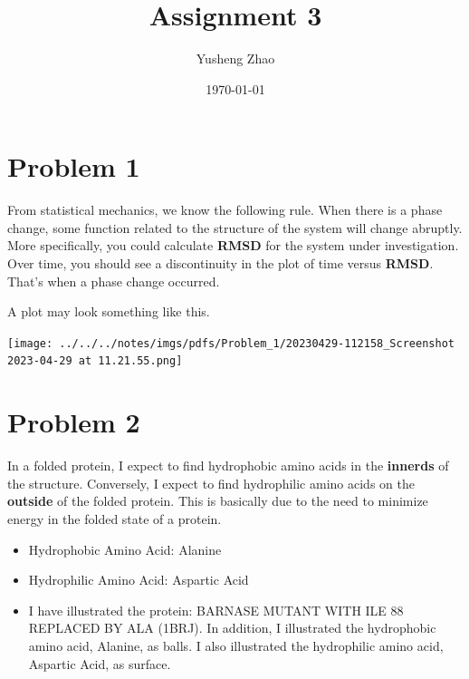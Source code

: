 \documentclass[11pt]{article}
\author{Yusheng Zhao}
\date{\today}
\title{Assignment 3}
\begin{document}
\maketitle


\section{Problem 1}
\label{sec:org65b8fcd}
From statistical mechanics, we know the following rule. When there is a phase
change, some function related to the structure of the system will change
abruptly. More specifically, you could calculate \textbf{RMSD} for the system under
investigation. Over time, you should see a discontinuity in the plot of time
versus \textbf{RMSD}. That's when a phase change occurred.

A plot may look something like this.

\begin{center}
\texttt{[image: ../../../notes/imgs/pdfs/Problem\_1/20230429-112158\_Screenshot 2023-04-29 at 11.21.55.png]}
\end{center}

\section{Problem 2}
\label{sec:org33cb368}
In a folded protein, I expect to find hydrophobic amino acids in the \textbf{innerds}
of the structure. Conversely, I expect to find hydrophilic amino acids on the
\textbf{outside} of the folded protein. This is basically due to the need to minimize
energy in the folded state of a protein.

\begin{itemize}
\item Hydrophobic Amino Acid: Alanine
\item Hydrophilic Amino Acid: Aspartic Acid
\item I have illustrated the protein: BARNASE MUTANT WITH ILE 88 REPLACED BY ALA
(1BRJ). In addition, I illustrated the hydrophobic amino acid, Alanine, as
balls. I also illustrated the hydrophilic amino acid, Aspartic Acid, as
surface.
\end{itemize}
\end{document}
